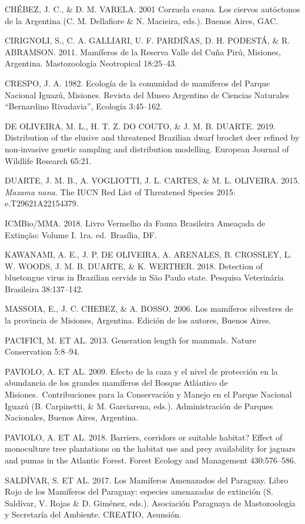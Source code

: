 \documentclass[
  x11names]{article}
\begin{document}
CHÉBEZ, J. C., \& D. M. VARELA. 2001 Corzuela e\textit{nana}. Los
ciervos autóctonos de la Argentina (C. M. Dellafiore \& N. Macieira,
eds.). Buenos Aires, GAC.

CIRIGNOLI, S., C. A. GALLIARI, U. F. PARDIÑAS, D. H. PODESTÁ, \& R.
ABRAMSON. 2011. Mamíferos de la Reserva Valle del Cuña Pirú, Misiones,
Argentina. Mastozoología Neotropical 18:25--43.

CRESPO, J. A. 1982. Ecología de la comunidad de mamíferos del Parque
Nacional Iguazú, Misiones. Revista del Museo Argentino de Ciencias
Naturales ``Bernardino Rivadavia'', Ecología 3:45--162.

DE OLIVEIRA, M. L., H. T. Z. DO COUTO, \& J. M. B. DUARTE. 2019.
Distribution of the elusive and threatened Brazilian dwarf brocket deer
refined by non-invasive genetic sampling and distribution modelling.
European Journal of Wildlife Research 65:21.

DUARTE, J. M. B., A. VOGLIOTTI, J. L. CARTES, \& M. L. OLIVEIRA. 2015.
\textit{Mazama} \textit{nana}. The IUCN Red List of Threatened Species
2015: e.T29621A22154379.

ICMBio/MMA. 2018. Livro Vermelho da Fauna Brasileira Ameaçada de
Extinção: Volume I. 1ra. ed.~Brasília, DF.

KAWANAMI, A. E., J. P. DE OLIVEIRA, A. ARENALES, B. CROSSLEY, L. W.
WOODS, J. M. B. DUARTE, \& K. WERTHER. 2018. Detection of bluetongue
virus in Brazilian cervids in São Paulo state. Pesquisa Veterinária
Brasileira 38:137--142.

MASSOIA, E., J. C. CHEBEZ, \& A. BOSSO. 2006. Los mamíferos silvestres
de la provincia de Misiones, Argentina. Edición de los autores, Buenos
Aires.

PACIFICI, M. ET AL. 2013. Generation length for mammals. Nature
Conservation 5:8--94.

PAVIOLO, A. ET AL. 2009. Efecto de la caza y el nivel de protección en
la abundancia de los grandes mamíferos del Bosque Atlántico de
Misiones.~Contribuciones para la Conservación y Manejo en el Parque
Nacional Iguazú (B. Carpinetti, \& M. Garciarena, eds.). Administración
de Parques Nacionales, Buenos Aires, Argentina.

PAVIOLO, A. ET AL. 2018. Barriers, corridors or suitable habitat? Effect
of monoculture tree plantations on the habitat use and prey availability
for jaguars and pumas in the Atlantic Forest. Forest Ecology and
Management 430:576--586.

SALDÍVAR, S. ET AL. 2017. Los Mamíferos Amenazados del Paraguay. Libro
Rojo de los Mamíferos del Paraguay: especies amenazadas de extinción (S.
Saldívar, V. Rojas \& D. Giménez, eds.). Asociación Paraguaya de
Mastozoología y Secretaría del Ambiente. CREATIO, Asunsión.
\end{document}
